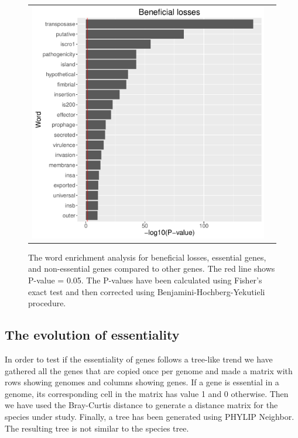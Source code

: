 \documentclass[12pt,letterpaper]{article}
\begin{document}
\begin{figure}
\begin{tabular}{c c}
\includegraphics[scale=0.4]{beneficialloss-pval.pdf}&
\end{tabular}
\caption{The word enrichment analysis for beneficial losses, essential genes, and non-essential genes compared to other genes. The red line shows P-value = 0.05. The P-values have been calculated using Fisher's exact test and then corrected using Benjamini-Hochberg-Yekutieli procedure.}
\label{fig:essentiality-pval}
\end{figure}

\subsection{The evolution of essentiality}
In order to test if the essentiality of genes follows a tree-like trend we have gathered all the genes that are copied once per genome and made a matrix with rows showing genomes and columns showing genes. If a gene is essential in a genome, its corresponding cell in the matrix has value 1 and 0 otherwise. Then we have used the Bray-Curtis distance to generate a distance matrix for the species under study. Finally, a tree has been generated using PHYLIP Neighbor. The resulting tree is not similar to the species tree.
\end{document}
